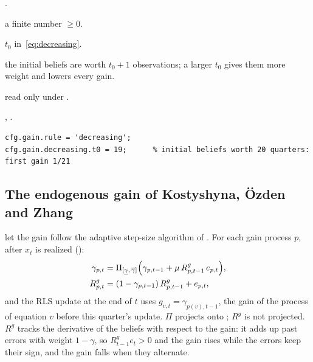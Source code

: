 \documentclass[11pt,a4paper]{article}
\DeclareRobustCommand{\codem}[1]{\texttt{\detokenize{#1}}}
\newenvironment{optspec}%
  {\begin{description}[style=sameline,leftmargin=2.7cm,labelwidth=2.5cm,font=\normalfont\itshape]}%
  {\end{description}}
\begin{document}
\subsubsection{\texorpdfstring{\codem{gain.decreasing.t0}}{gain.decreasing.t0}}\label{opt:gain-decreasing-t0}
\begin{optspec}
  \item[Default] .
  \item[Values] a finite number $\ge 0$.
  \item[Math] $t_0$ in~\eqref{eq:decreasing}.
  \item[Assumptions] the initial beliefs are worth $t_0 + 1$ observations; a larger $t_0$ gives
        them more weight and lowers every gain.
  \item[Interactions] read only under .
  \item[Code] , .
  \item[Example]
\begin{lstlisting}
cfg.gain.rule = 'decreasing';
cfg.gain.decreasing.t0 = 19;      % initial beliefs worth 20 quarters: first gain 1/21
\end{lstlisting}
\end{optspec}

\subsection{The endogenous gain of Kostyshyna, \"Ozden and Zhang}\label{sec:koz}

\citet[eq.~9]{koz2024} let the gain follow the adaptive step-size algorithm of
\citet{kostyshyna2012} \citep[see also][]{kushner2003}. For each gain process $p$, after $x_t$ is
realized ():
\begin{align}\label{eq:koz}
  \gamma_{p,t} &= \Pi_{[\underline{\gamma},\,\overline{\gamma}]}\Bigl(\gamma_{p,t-1} + \mu\, R^g_{p,t-1}\, e_{p,t}\Bigr),\\
  R^g_{p,t} &= (1-\gamma_{p,t-1})\, R^g_{p,t-1} + e_{p,t}, \notag
\end{align}
and the RLS update at the end of $t$ uses $g_{v,t} = \gamma_{p(v),t-1}$, the gain of the process of
equation $v$ before this quarter's update. $\Pi$ projects onto ; $R^g$ is
not projected. $R^g$ tracks the derivative of the beliefs with respect to the gain: it adds up
past errors with weight $1-\gamma$, so $R^g_{t-1}e_t > 0$ and the gain rises while the errors keep
their sign, and the gain falls when they alternate.
\end{document}
